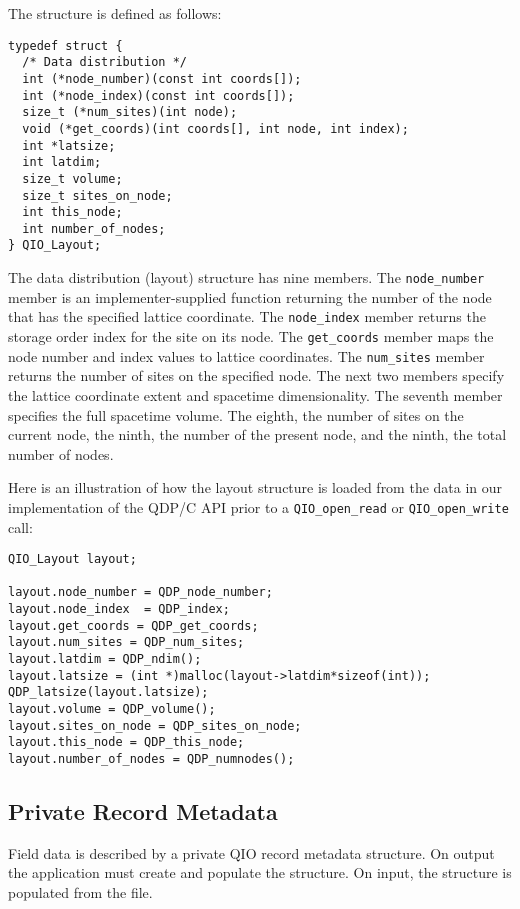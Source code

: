 \documentclass{article}
\begin{document}
The structure is defined as follows:
\begin{verbatim}
typedef struct {
  /* Data distribution */
  int (*node_number)(const int coords[]);
  int (*node_index)(const int coords[]);
  size_t (*num_sites)(int node);
  void (*get_coords)(int coords[], int node, int index);
  int *latsize;
  int latdim;
  size_t volume;
  size_t sites_on_node;
  int this_node;
  int number_of_nodes;
} QIO_Layout;
\end{verbatim}
%
The data distribution (layout) structure has nine members.  The
\verb|node_number| member is an implementer-supplied function
returning the number of the node that has the specified lattice
coordinate.  The \verb|node_index| member returns the storage order
index for the site on its node.  The \verb|get_coords| member maps the
node number and index values to lattice coordinates. The
\verb|num_sites| member returns the number of sites on the specified
node. The next two members specify the lattice coordinate extent and
spacetime dimensionality.  The seventh member specifies the full
spacetime volume.  The eighth, the number of sites on the current
node, the ninth, the number of the present node, and the ninth, the
total number of nodes.

Here is an illustration of how the layout structure is loaded from the
data in our implementation of the QDP/C API prior to a
\verb|QIO_open_read| or \verb|QIO_open_write| call:
%
\begin{verbatim}
QIO_Layout layout;

layout.node_number = QDP_node_number;
layout.node_index  = QDP_index;
layout.get_coords = QDP_get_coords;
layout.num_sites = QDP_num_sites;
layout.latdim = QDP_ndim();
layout.latsize = (int *)malloc(layout->latdim*sizeof(int));
QDP_latsize(layout.latsize);
layout.volume = QDP_volume();
layout.sites_on_node = QDP_sites_on_node;
layout.this_node = QDP_this_node;
layout.number_of_nodes = QDP_numnodes();
\end{verbatim}

\subsection{Private Record Metadata}
\label{sec:recordinfo}

Field data is described by a private QIO record metadata structure.
On output the application must create and populate the structure.  On
input, the structure is populated from the file.
\end{document}
